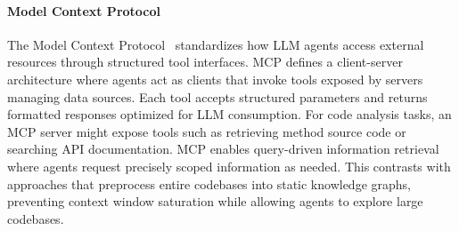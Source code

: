 \paragraph{Model Context Protocol}
The Model Context Protocol~\cite{mcp2024} standardizes how LLM agents access external resources through structured tool interfaces. MCP defines a client-server architecture where agents act as clients that invoke tools exposed by servers managing data sources. Each tool accepts structured parameters and returns formatted responses optimized for LLM consumption. For code analysis tasks, an MCP server might expose tools such as retrieving method source code or searching API documentation. MCP enables query-driven information retrieval where agents request precisely scoped information as needed. This contrasts with approaches that preprocess entire codebases into static knowledge graphs, preventing context window saturation while allowing agents to explore large codebases.
